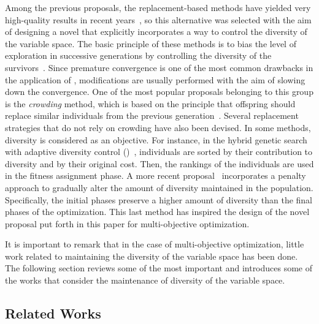 Among the previous proposals, the replacement-based methods have yielded very high-quality results in recent years~\cite{Segura:17}, so
this alternative was selected with the aim of designing a novel \MOEA{} that explicitly incorporates a way to control the diversity 
of the variable space.
%
The basic principle of these methods is to bias the level of exploration in successive generations by 
controlling the diversity of the survivors~\cite{Segura:17}.
%
Since premature convergence is one of the most common drawbacks in the application of \EAS{}, 
modifications are usually performed with the aim of slowing down the convergence.
%
One of the most popular proposals belonging to this group is the \textit{crowding} method, which
is based on the principle that offspring should replace similar individuals from the previous generation~\cite{Mengshoel:14}.
%
Several replacement strategies that do not rely on crowding have also been devised.
%
In some methods, diversity is considered as an objective.
%
For instance, in the hybrid genetic search with adaptive diversity control (\HGSADC{})~\cite{Vidal:13}, individuals are sorted 
by their contribution to diversity and by their original cost.
%
Then, the rankings of the individuals are used in the fitness assignment phase.
%
A more recent proposal~\cite{Segura:17} incorporates a penalty approach to gradually alter the amount of diversity 
maintained in the population.
%
Specifically, the initial phases preserve a higher amount of diversity than the final phases of the optimization.
%
This last method has inspired the design of the novel proposal put forth in this paper for multi-objective optimization.
%

It is important to remark that in the case of multi-objective optimization, little work related to maintaining the 
diversity of the variable space has been done.
%
The following section reviews some of the most important \MOEAS{} and introduces some of the works that consider
the maintenance of diversity of the variable space.


\subsection{Related Works}

